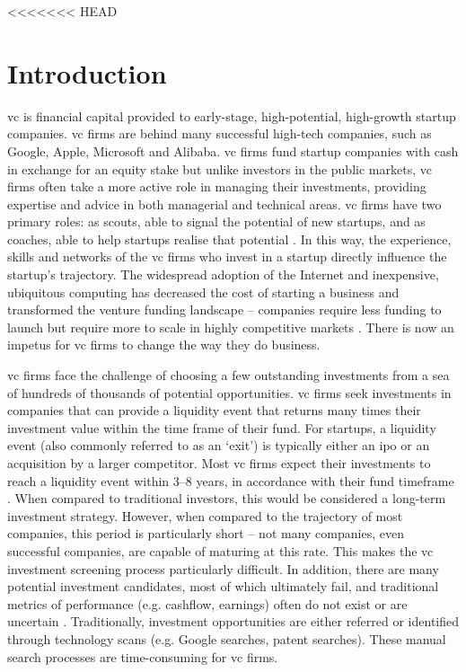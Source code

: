 \documentclass[../thesis/thesis.tex]{subfiles}
\begin{document}
<<<<<<< HEAD

\chapter{Introduction}
\label{chap:introduction}

\Gls{vc} is financial capital provided to early-stage, high-potential, high-growth startup companies. \Gls{vc} firms are behind many successful high-tech companies, such as Google, Apple, Microsoft and Alibaba. \Gls{vc} firms fund startup companies with cash in exchange for an equity stake but unlike investors in the public markets, \gls{vc} firms often take a more active role in managing their investments, providing expertise and advice in both managerial and technical areas. \Gls{vc} firms have two primary roles: as scouts, able to signal the potential of new startups, and as coaches, able to help startups realise that potential \cite{baum2004}. In this way, the experience, skills and networks of the \gls{vc} firms who invest in a startup directly influence the startup’s trajectory. The widespread adoption of the Internet and inexpensive, ubiquitous computing has decreased the cost of starting a business and transformed the venture funding landscape -- companies require less funding to launch but require more to scale in highly competitive markets \cite{graham2013}. There is now an impetus for \gls{vc} firms to change the way they do business.

\Gls{vc} firms face the challenge of choosing a few outstanding investments from a sea of hundreds of thousands of potential opportunities. \Gls{vc} firms seek investments in companies that can provide a liquidity event that returns many times their investment value within the time frame of their fund. For startups, a liquidity event (also commonly referred to as an `exit’) is typically either an \gls{ipo} or an acquisition by a larger competitor. Most \gls{vc} firms expect their investments to reach a liquidity event within 3--8 years, in accordance with their fund timeframe \cite{CITE}. When compared to traditional investors, this would be considered a long-term investment strategy. However, when compared to the trajectory of most companies, this period is particularly short -- not many companies, even successful companies, are capable of maturing at this rate. This makes the \gls{vc} investment screening process particularly difficult. In addition, there are many potential investment candidates, most of which ultimately fail, and traditional metrics of performance (e.g. cashflow, earnings) often do not exist or are uncertain \cite{shane2002}. Traditionally, investment opportunities are either referred or identified through technology scans (e.g. Google searches, patent searches). These manual search processes are time-consuming for \gls{vc} firms.
\end{document}
